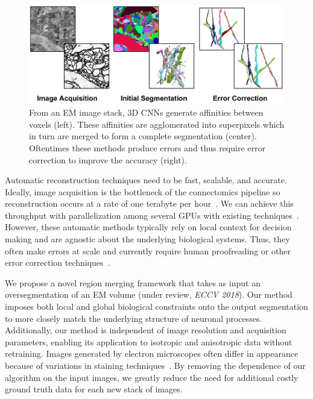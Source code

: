 \begin{figure}
	\includegraphics[width=\linewidth]{./figures/proposal-header.png}
	\caption{From an EM image stack, 3D CNNs generate affinities between voxels (left). These affinities are agglomerated into superpixels which in turn are merged to form a complete segmentation (center). Oftentimes these methods produce errors and thus require error correction to improve the accuracy (right).}
	\label{fig:overview}
\end{figure}


Automatic reconstruction techniques need to be fast, scalable, and accurate.
Ideally, image acquisition is the bottleneck of the connectomics pipeline so reconstruction occurs at a rate of one terabyte per hour~\cite{haehn2017scalable}.
We can achieve this throughput with parallelization among several GPUs with existing techniques~\cite{funke2017deep,parag2017anisotropic}.
However, these automatic methods typically rely on local context for decision making and are agnostic about the underlying biological systems.
Thus, they often make errors at scale and currently require human proofreading or other error correction techniques~\cite{haehn2017guided,error_correction_using_CNN}. 

We propose a novel region merging framework that takes as input an oversegmentation of an EM volume (under review, \textit{ECCV 2018}).
Our method imposes both local and global biological constraints onto the output segmentation to more closely match the underlying structure of neuronal processes.
Additionally, our method is independent of image resolution and acquisition parameters, enabling its application to isotropic and anisotropic data without retraining.
Images generated by electron microscopes often differ in appearance because of variations in staining techniques~\cite{briggman2012volume}.
By removing the dependence of our algorithm on the input images, we greatly reduce the need for additional costly ground truth data for each new stack of images.
